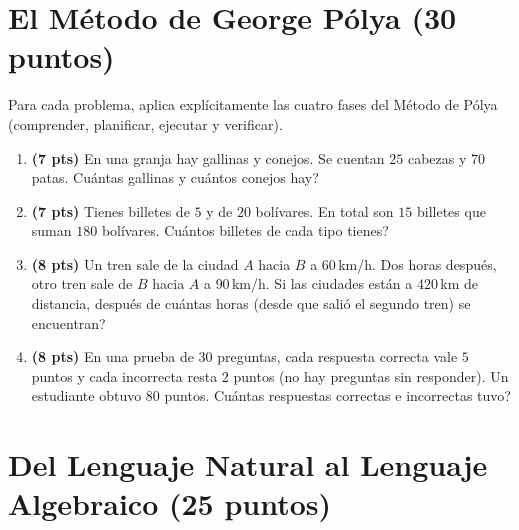 \documentclass[12pt, letterpaper]{article}
\begin{document}
\newpage

\section{El Método de George Pólya (30 puntos)}

\noindent Para cada problema, aplica explícitamente las cuatro fases del Método de Pólya (comprender, planificar, ejecutar y verificar).

\begin{enumerate}[leftmargin=*]
  \item \textbf{(7 pts)} En una granja hay gallinas y conejos. Se cuentan $25$ cabezas y $70$ patas. \textquestiondown Cuántas gallinas y cuántos conejos hay?

  \item \textbf{(7 pts)} Tienes billetes de $5$ y de $20$ bolívares. En total son $15$ billetes que suman $180$ bolívares. \textquestiondown Cuántos billetes de cada tipo tienes?

  \item \textbf{(8 pts)} Un tren sale de la ciudad $A$ hacia $B$ a $60$\,km/h. Dos horas después, otro tren sale de $B$ hacia $A$ a $90$\,km/h. Si las ciudades están a $420$\,km de distancia, \textquestiondown después de cuántas horas (desde que salió el segundo tren) se encuentran?

  \item \textbf{(8 pts)} En una prueba de $30$ preguntas, cada respuesta correcta vale $5$ puntos y cada incorrecta resta $2$ puntos (no hay preguntas sin responder). Un estudiante obtuvo $80$ puntos. \textquestiondown Cuántas respuestas correctas e incorrectas tuvo?
\end{enumerate}

\newpage

\section{Del Lenguaje Natural al Lenguaje Algebraico (25 puntos)}
\end{document}
